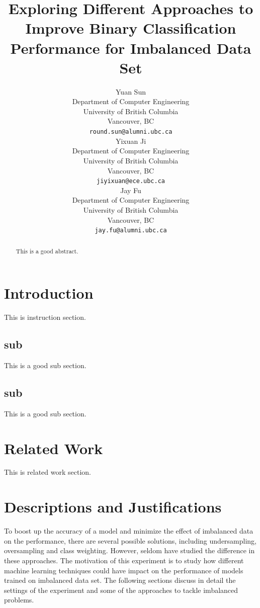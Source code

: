 \documentclass{article}
\title{Exploring Different Approaches to Improve Binary Classification Performance for Imbalanced Data Set}
\author{%
  Yuan Sun\\
  Department of Computer Engineering\\
  University of British Columbia\\
  Vancouver, BC\\
  \texttt{round.sun@alumni.ubc.ca}\\
  \And
  Yixuan Ji\\
  Department of Computer Engineering\\
  University of British Columbia\\
  Vancouver, BC\\
  \texttt{jiyixuan@ece.ubc.ca}\\
  \AND
  Jay Fu\\
  Department of Computer Engineering\\
  University of British Columbia\\
  Vancouver, BC\\
  \texttt{jay.fu@alumni.ubc.ca}\\
}
\begin{document}

\maketitle

\begin{abstract}
  This is a good abstract.
\end{abstract}

\section{Introduction}

This is instruction section.

\subsection{sub}

This is a good sub section.

\subsection{sub}

This is a good sub section.

\section{Related Work}
\label{related_work}

This is related work section.

\section{Descriptions and Justifications}
\label{headings}

To boost up the accuracy of a model and minimize the effect of imbalanced data on the performance, there are several possible solutions, including undersampling, oversampling and class weighting. However, seldom have studied the difference in these approaches. The motivation of this experiment is to study how different machine learning techniques could have impact on the performance of models trained on imbalanced data set. The following sections discuss in detail the settings of the experiment and some of the approaches to tackle imbalanced problems.
\end{document}
